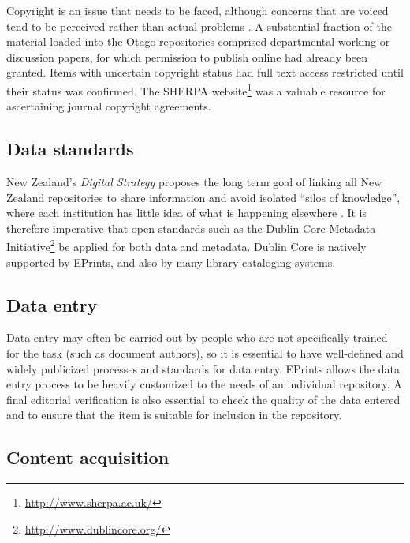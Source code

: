 \documentclass[12pt,pdftex,a4paper,titlepage]{article}
\begin{document}
Copyright is an issue that needs to be faced, although concerns that are voiced tend to be perceived rather than actual problems \cite{EPri-O-2005-SelfFAQ,Sale-A-2006-OAchapter}. A substantial fraction of the material loaded into the Otago repositories comprised departmental working or discussion papers, for which permission to publish online had already been granted. Items with uncertain copyright status had full text access restricted until their status was confirmed. The SHERPA website\footnote{\url{http://www.sherpa.ac.uk/}} was a valuable resource for ascertaining journal copyright agreements.


\subsection{Data standards}

New Zealand's \emph{Digital Strategy} proposes the long term goal of linking all New Zealand repositories to share information and avoid isolated ``silos of knowledge'', where each institution has little idea of what is happening elsewhere \cite{NZG-2005-digital_strategy}. It is therefore imperative that open standards such as the Dublin Core Metadata Initiative\footnote{\url{http://www.dublincore.org/}} be applied for both data and metadata. Dublin Core is natively supported by EPrints, and also by many library cataloging systems.


\subsection{Data entry}

Data entry may often be carried out by people who are not specifically trained for the task (such as document authors), so it is essential to have well-defined and widely publicized processes and standards for data entry. EPrints allows the data entry process to be heavily customized to the needs of an individual repository. A final editorial verification is also essential to check the quality of the data entered and to ensure that the item is suitable for inclusion in the repository.


\subsection{Content acquisition}
\label{sec-content}
\end{document}
